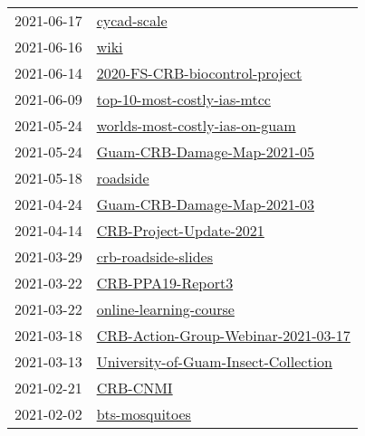 \begin{longtable}{ll}
2021-06-17 &                                                   \href{https://github.com/aubreymoore/cycad-scale}{cycad-scale} \\
2021-06-16 &                                                                 \href{https://github.com/aubreymoore/wiki}{wiki} \\
2021-06-14 &             \href{https://github.com/aubreymoore/2020-FS-CRB-biocontrol-project}{2020-FS-CRB-biocontrol-project} \\
2021-06-09 &                   \href{https://github.com/aubreymoore/top-10-most-costly-ias-mtcc}{top-10-most-costly-ias-mtcc} \\
2021-05-24 &             \href{https://github.com/aubreymoore/worlds-most-costly-ias-on-guam}{worlds-most-costly-ias-on-guam} \\
2021-05-24 &                   \href{https://github.com/aubreymoore/Guam-CRB-Damage-Map-2021-05}{Guam-CRB-Damage-Map-2021-05} \\
2021-05-18 &                                                         \href{https://github.com/aubreymoore/roadside}{roadside} \\
2021-04-24 &                   \href{https://github.com/aubreymoore/Guam-CRB-Damage-Map-2021-03}{Guam-CRB-Damage-Map-2021-03} \\
2021-04-14 &                           \href{https://github.com/aubreymoore/CRB-Project-Update-2021}{CRB-Project-Update-2021} \\
2021-03-29 &                                   \href{https://github.com/aubreymoore/crb-roadside-slides}{crb-roadside-slides} \\
2021-03-22 &                                       \href{https://github.com/aubreymoore/CRB-PPA19-Report3}{CRB-PPA19-Report3} \\
2021-03-22 &                             \href{https://github.com/aubreymoore/online-learning-course}{online-learning-course} \\
2021-03-18 &   \href{https://github.com/aubreymoore/CRB-Action-Group-Webinar-2021-03-17}{CRB-Action-Group-Webinar-2021-03-17} \\
2021-03-13 & \href{https://github.com/aubreymoore/University-of-Guam-Insect-Collection}{University-of-Guam-Insect-Collection} \\
2021-02-21 &                                                         \href{https://github.com/aubreymoore/CRB-CNMI}{CRB-CNMI} \\
2021-02-02 &                                             \href{https://github.com/aubreymoore/bts-mosquitoes}{bts-mosquitoes} \\

\end{longtable}
